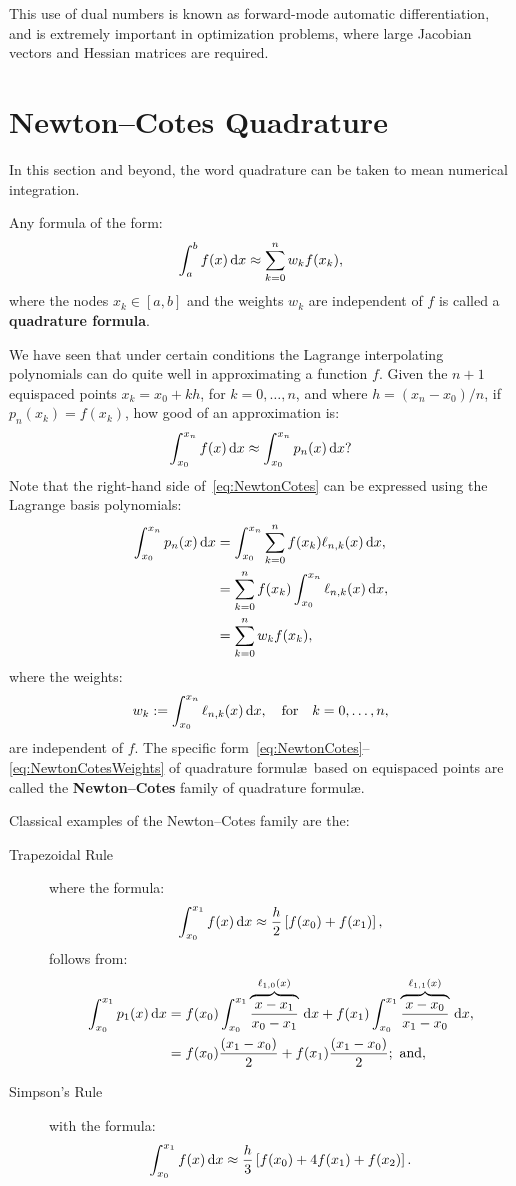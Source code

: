 This use of dual numbers is known as forward-mode automatic differentiation, and is extremely important in optimization problems, where large Jacobian vectors and Hessian matrices are required.

\section{Newton--Cotes Quadrature}

In this section and beyond, the word quadrature can be taken to mean numerical integration.
\begin{definition}
Any formula of the form:
\[
\int_a^b f(x){\rm\,d} x \approx \sum_{k=0}^n w_k f(x_k),
\]
where the nodes $x_k\in[a,b]$ and the weights $w_k$ are independent of $f$ is called a {\bf quadrature formula}.
\end{definition}
We have seen that under certain conditions the Lagrange interpolating polynomials can do quite well in approximating a function $f$. Given the $n+1$ equispaced points $x_k = x_0+kh$, for $k=0,\ldots,n$, and where $h=(x_n-x_0)/n$, if $p_n(x_k) = f(x_k)$, how good of an approximation is:
\begin{equation}\label{eq:NewtonCotes}
\int_{x_0}^{x_n} f(x){\rm\,d} x \approx \int_{x_0}^{x_n} p_n(x){\rm\,d} x ?
\end{equation}
Note that the right-hand side of~\eqref{eq:NewtonCotes} can be expressed using the Lagrange basis polynomials:
\begin{align}
\int_{x_0}^{x_n} p_n(x){\rm\,d} x & = \int_{x_0}^{x_n} \sum_{k=0}^n f(x_k) \ell_{n,k}(x){\rm\,d} x,\nonumber\\
& = \sum_{k=0}^n f(x_k) \int_{x_0}^{x_n} \ell_{n,k}(x){\rm\,d} x,\\
& = \sum_{k=0}^n w_k f(x_k),\nonumber
\end{align}
where the weights:
\begin{equation}\label{eq:NewtonCotesWeights}
w_k := \int_{x_0}^{x_n} \ell_{n,k}(x){\rm\,d} x,\quad{\rm for}\quad k=0,\ldots,n,
\end{equation}
are independent of $f$. The specific form~\eqref{eq:NewtonCotes}--\eqref{eq:NewtonCotesWeights} of quadrature formul\ae~based on equispaced points are called the {\bf Newton--Cotes} family of quadrature formul\ae.

Classical examples of the Newton--Cotes family are the:
\begin{description}
\item[Trapezoidal Rule] where the formula:
\[
\int_{x_0}^{x_1}f(x)\ud x \approx \dfrac{h}{2}\br[f(x_0)+f(x_1)],
\]
follows from:
\begin{align*}
\int_{x_0}^{x_1}p_1(x){\rm\,d} x & = f(x_0)\int_{x_0}^{x_1}\overbrace{\dfrac{x-x_1}{x_0-x_1}}^{\ell_{1,0}(x)}{\rm\,d} x + f(x_1)\int_{x_0}^{x_1}\overbrace{\dfrac{x-x_0}{x_1-x_0}}^{\ell_{1,1}(x)}{\rm\,d} x,\\
& = f(x_0)\dfrac{(x_1-x_0)}{2} + f(x_1)\dfrac{(x_1-x_0)}{2};\hbox{ and},
\end{align*}
\item[Simpson's Rule] with the formula:
\[
\int_{x_0}^{x_1}f(x)\ud x \approx \dfrac{h}{3}\br[f(x_0)+4f(x_1)+f(x_2)].
\]
\end{description}

